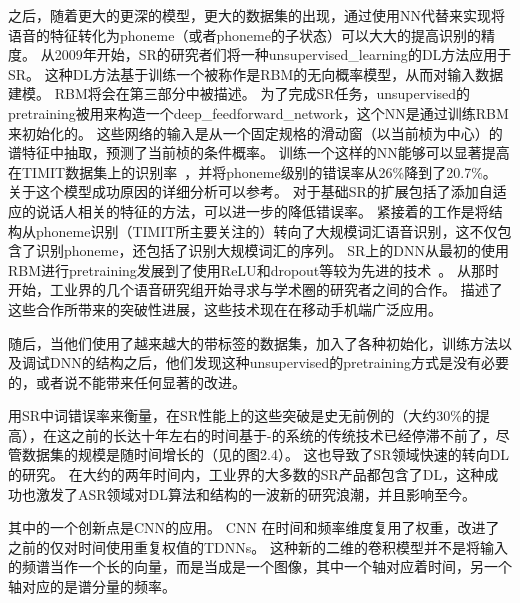 之后，随着更大的更深的模型，更大的数据集的出现，通过使用\gls{NN}代替来实现将语音的特征转化为\gls{phoneme}（或者\gls{phoneme}的子状态）可以大大的提高识别的精度。
从2009年开始，\gls{SR}的研究者们将一种\gls{unsupervised_learning}的\gls{DL}方法应用于\gls{SR}。
这种\gls{DL}方法基于训练一个被称作是\gls{RBM}的无向概率模型，从而对输入数据建模。
 \gls{RBM}将会在第三部分中被描述。
 为了完成\gls{SR}任务，\gls{unsupervised}的\gls{pretraining}被用来构造一个\gls{deep_feedforward_network}，这个\gls{NN}是通过训练\gls{RBM}来初始化的。
 这些网络的输入是从一个固定规格的滑动窗（以当前桢为中心）的谱特征中抽取，预测了当前桢的条件概率。
 训练一个这样的\gls{NN}能够可以显著提高在TIMIT数据集上的识别率~\citep{mohamed2009deep,Mohamed+Dahl+Hinton-2012}，并将\gls{phoneme}级别的错误率从26\%降到了20.7\%。
关于这个模型成功原因的详细分析可以参考\citet{mohamed2012understanding}。  
 对于基础\gls{SR}的扩展包括了添加自适应的说话人相关的特征\citep{mohamed2011deep}的方法，可以进一步的降低错误率。
 紧接着的工作是将结构从\gls{phoneme}识别（TIMIT所主要关注的）转向了大规模词汇语音识别\citep{Dahl2012}，这不仅包含了识别\gls{phoneme}，还包括了识别大规模词汇的序列。
\gls{SR}上的\gls{DNN}从最初的使用\gls{RBM}进行\gls{pretraining}发展到了使用\gls{ReLU}和\gls{dropout}等较为先进的技术~\citep{Zeiler+al-ICASSP-2013,Dahl-et-al-ICASSP2013}。
从那时开始，工业界的几个语音研究组开始寻求与学术圈的研究者之间的合作。
\citet{Hinton-et-al-2012}描述了这些合作所带来的突破性进展，这些技术现在在移动手机端广泛应用。

随后，当他们使用了越来越大的带标签的数据集，加入了各种初始化，训练方法以及调试\gls{DNN}的结构之后，他们发现这种\gls{unsupervised}的\gls{pretraining}方式是没有必要的，或者说不能带来任何显著的改进。

用\gls{SR}中词错误率来衡量，在\gls{SR}性能上的这些突破是史无前例的（大约30\%的提高），在这之前的长达十年左右的时间基于-的系统的传统技术已经停滞不前了，尽管数据集的规模是随时间增长的（见\citet{Deng+Yu-2014}的图2.4）。
这也导致了\gls{SR}领域快速的转向\gls{DL}的研究。
在大约的两年时间内，工业界的大多数的\gls{SR}产品都包含了\gls{DL}，这种成功也激发了\gls{ASR}领域对\gls{DL}算法和结构的一波新的研究浪潮，并且影响至今。

其中的一个创新点是\gls{CNN}的应用\citep{Sainath-et-al-ICASSP2013}。
\gls{CNN} 在时间和频率维度复用了权重，改进了之前的仅对时间使用重复权值的\gls{TDNNs}。
这种新的二维的卷积模型并不是将输入的频谱当作一个长的向量，而是当成是一个图像，其中一个轴对应着时间，另一个轴对应的是谱分量的频率。

